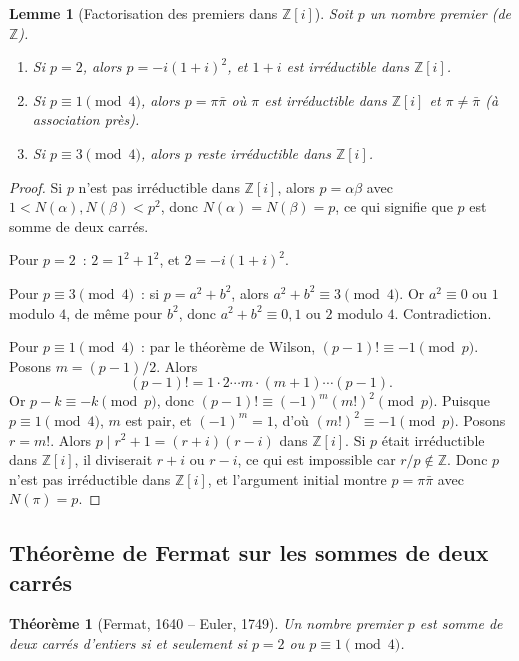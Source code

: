 \documentclass[12pt,a4paper,openany]{book}
\theoremstyle{definition}
\theoremstyle{plain}
\newtheorem{theoreme}[definition]{Théorème}
\newtheorem{lemme}[definition]{Lemme}
\theoremstyle{remark}
\newcommand{\Z}{\mathbb{Z}}
\begin{document}
\begin{lemme}[{Factorisation des premiers dans $\Z[i]$}]
\label{lem:premiers-gaussiens}
\index{nombre premier!dans $\Z[i]$}
Soit $p$ un nombre premier (de $\Z$).
\begin{enumerate}[label=(\roman*)]
  \item Si $p = 2$, alors $p = -i(1+i)^2$, et $1+i$ est irréductible dans $\Z[i]$.
  \item Si $p \equiv 1 \pmod{4}$, alors $p = \pi\bar\pi$ où $\pi$ est irréductible dans
    $\Z[i]$ et $\pi \neq \bar\pi$ (à association près).
  \item Si $p \equiv 3 \pmod{4}$, alors $p$ reste irréductible dans $\Z[i]$.
\end{enumerate}
\end{lemme}

\begin{proof}
Si $p$ n'est pas irréductible dans $\Z[i]$, alors $p = \alpha\beta$ avec
$1 < N(\alpha), N(\beta) < p^2$, donc $N(\alpha) = N(\beta) = p$, ce qui signifie que $p$
est somme de deux carrés.

Pour $p = 2$~: $2 = 1^2 + 1^2$, et $2 = -i(1+i)^2$.

Pour $p \equiv 3 \pmod{4}$~: si $p = a^2 + b^2$, alors $a^2 + b^2 \equiv 3 \pmod{4}$.
Or $a^2 \equiv 0$ ou $1$ modulo $4$, de même pour $b^2$, donc $a^2 + b^2 \equiv 0, 1$
ou $2$ modulo $4$. Contradiction.

Pour $p \equiv 1 \pmod{4}$~: par le théorème de Wilson, $(p-1)! \equiv -1 \pmod{p}$.
Posons $m = (p-1)/2$. Alors
\[
  (p-1)! = 1 \cdot 2 \cdots m \cdot (m+1) \cdots (p-1).
\]
Or $p - k \equiv -k \pmod{p}$, donc $(p-1)! \equiv (-1)^m (m!)^2 \pmod{p}$. Puisque
$p \equiv 1 \pmod{4}$, $m$ est pair, et $(-1)^m = 1$, d'où $(m!)^2 \equiv -1 \pmod{p}$.
Posons $r = m!$. Alors $p \mid r^2 + 1 = (r+i)(r-i)$ dans $\Z[i]$. Si $p$ était
irréductible dans $\Z[i]$, il diviserait $r+i$ ou $r-i$, ce qui est impossible car
$r/p \notin \Z$. Donc $p$ n'est pas irréductible dans $\Z[i]$, et l'argument initial
montre $p = \pi\bar\pi$ avec $N(\pi) = p$.
\end{proof}

\subsection{Théorème de Fermat sur les sommes de deux carrés}

\begin{theoreme}[Fermat, 1640 -- Euler, 1749]
\label{thm:fermat-deux-carres}
Un nombre premier $p$ est somme de deux carrés d'entiers si et seulement si $p = 2$ ou
$p \equiv 1 \pmod{4}$.
\end{theoreme}
\end{document}
